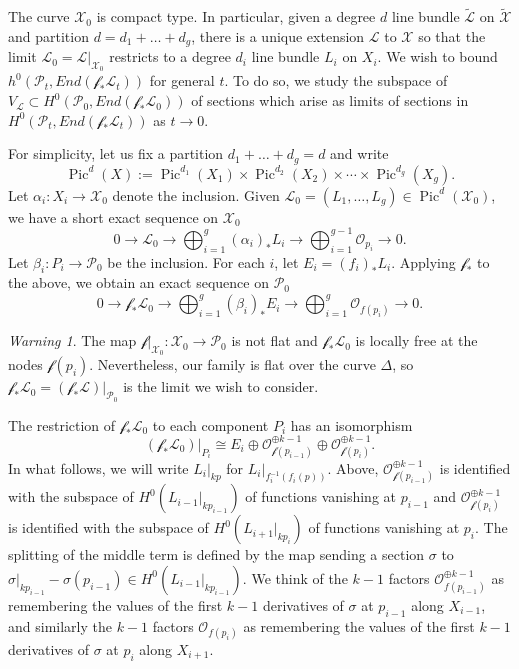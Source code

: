 \documentclass[12pt]{amsart}
\renewcommand{\P}{\mathcal{P}}
\renewcommand{\L}{\mathcal{L}}
\newcommand{\X}{\mathcal{X}}
\renewcommand{\O}{\mathscr{O}}
\renewcommand{\tilde}{\widetilde}
\newcommand{\f}{\mathcal{f}}
\DeclareMathOperator{\Pic}{Pic}
\theoremstyle{definition}
\theoremstyle{remark}
\theoremstyle{remark}
\newtheorem*{warning}{Warning}
\numberwithin{equation}{section}
\begin{document}
The curve $\X_0$ is compact type. In particular, given a degree $d$ line bundle $\tilde{\L}$ on $\tilde{\X}$ and 
 partition $d = d_1 + \ldots + d_g$, there is a unique extension $\mathcal{L}$ to $\X$ so that the limit $\L_0 = \L|_{\X_0}$ restricts to a degree $d_i$ line bundle $L_i$ on $X_i$.  We wish to bound $h^0(\P_t, End(\f_*\L_t))$ for general $t$. To do so, we study the subspace of $V_\L \subset H^0(\P_0, End(\f_*\L_0))$ of sections which arise as limits of sections in $H^0(\P_t, End(\f_*\L_t))$ as $t \rightarrow 0$.

 For simplicity, let us fix a partition $d_1 + \ldots + d_g = d$ and
 write 
 \[\Pic^d(X) := \Pic^{d_1}(X_1) \times \Pic^{d_2}(X_2) \times \cdots \times \Pic^{d_g}(X_g).\]  
 Let $\alpha_i : X_i \rightarrow \X_0$ denote the inclusion.
 Given $\L_0 = (L_1, \ldots, L_g) \in \Pic^d(\X_0)$, we have a short exact sequence on $\X_0$
 \[0 \rightarrow \L_0 \rightarrow \bigoplus_{i=1}^g (\alpha_i)_* L_i \rightarrow \bigoplus_{i=1}^{g-1} \O_{p_i} \rightarrow 0.\] 
Let $\beta_i : P_i \rightarrow \P_0$ be the inclusion.
For each $i$, let $E_i = (f_i)_* L_i$.
Applying $\f_*$ to the above, we obtain an exact sequence on $\P_0$
 \begin{equation} \label{flseq}
 0 \rightarrow \f_*\L_0 \rightarrow \bigoplus_{i=1}^g (\beta_i)_*E_i \rightarrow \bigoplus_{i=1}^g \O_{f(p_i)} \rightarrow 0.
 \end{equation}
\begin{warning}
The map $\f|_{\X_0}: \X_0 \rightarrow \P_0$ is not flat and $\f_*\L_0$ is  locally free at the nodes $\f(p_i)$. Nevertheless, our family is flat over the curve $\Delta$, so $\f_*\L_0 = (\f_*\L)|_{\P_0}$ is the limit we wish to consider.
\end{warning}
The restriction of $\f_*\L_0$ to each component $P_i$ has an isomorphism
\begin{equation} \label{compiso}
(\f_*\L_0)|_{P_i} \cong E_i \oplus \O_{\f(p_{i-1})}^{\oplus k-1} \oplus \O_{\f(p_i)}^{\oplus k-1}.
\end{equation}
In what follows, we will write $L_i|_{kp}$ for $L_i|_{f_i^{-1}(f_i(p))}$.
Above, $\O_{\f(p_{i-1})}^{\oplus k-1}$ is identified with the subspace of $H^0(L_{i-1}|_{kp_{i-1}})$ of functions vanishing at $p_{i-1}$ and 
$\O_{\f(p_{i})}^{\oplus k-1}$ is identified with the subspace of $H^0(L_{i+1}|_{kp_i})$ of functions vanishing at $p_{i}$.
The splitting of the middle term is defined by the map sending a section $\sigma$ to $\sigma|_{kp_{i-1}} - \sigma(p_{i-1}) \in H^0(L_{i-1}|_{kp_{i-1}})$. We think of the $k-1$ factors $\O_{f(p_{i-1})}^{\oplus k-1}$ as remembering the values of the first $k-1$ derivatives of $\sigma$ at $p_{i-1}$ along $X_{i-1}$, and similarly the $k-1$ factors $\O_{f(p_{i})}$ as remembering the values of the first $k-1$ derivatives of $\sigma$ at $p_{i}$ along $X_{i+1}$.
\end{document}
